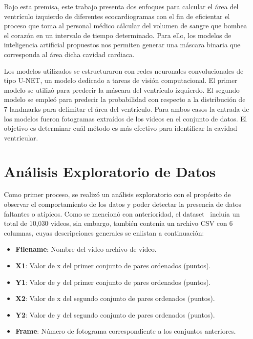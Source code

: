 \documentclass[runningheads]{llncs}
\begin{document}
Bajo esta premisa, este trabajo presenta dos enfoques para calcular el área del ventrículo izquierdo de diferentes ecocardiogramas con el fin de eficientar el proceso que toma al personal médico cálcular del volumen de sangre que bombea el corazón en un intervalo de tiempo determinado. Para ello, los modelos de inteligencia artificial propuestos nos permiten generar una máscara binaria que corresponda al área dicha cavidad cardiaca.

Los modelos utilizados se estructuraron con redes neuronales convolucionales de tipo U-NET, un modelo dedicado a tareas de visión computacional. El primer modelo se utilizó para predecir la máscara del ventrículo izquierdo. El segundo modelo se empleó para predecir la probabilidad con respecto a la distribución de 7 landmarks para delimitar el área del ventrículo. Para ambos casos la entrada de los modelos fueron fotogramas extraídos de los videos en el conjunto de datos. El objetivo es determinar cuál método es más efectivo para identificar la cavidad ventricular.

\section{Análisis Exploratorio de Datos}

Como primer proceso, se realizó un análisis exploratorio con el propósito de observar el comportamiento de los datos y poder detectar la presencia de datos faltantes o atípicos. Como se mencionó con anterioridad, el dataset~\cite{ref_url1} incluía un total de 10,030 videos, sin embargo, también contenía un archivo CSV con 6 columnas, cuyas descripciones generales se enlistan a continuación:

\begin{itemize}
    \begin{itemize}
        \item \textbf{Filename}: Nombre del video archivo de video.
        \item \textbf{X1}: Valor de x del primer conjunto de pares ordenados (puntos).
        \item \textbf{Y1}: Valor de y del primer conjunto de pares ordenados (puntos).
        \item \textbf{X2}: Valor de x del segundo conjunto de pares ordenados (puntos).
        \item \textbf{Y2}: Valor de y del segundo conjunto de pares ordenados (puntos).
        \item \textbf{Frame}: Número de fotograma correspondiente a los conjuntos anteriores.
    \end{itemize}
\end{itemize}
\end{document}
